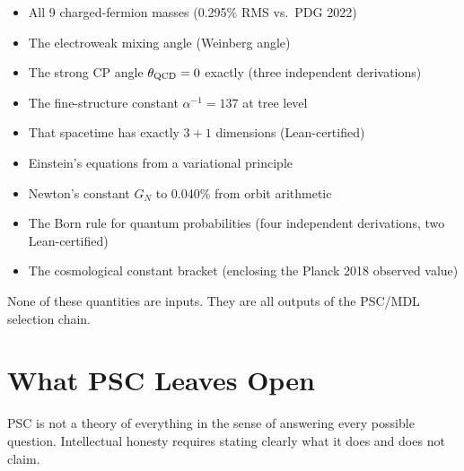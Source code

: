 \documentclass[11pt,a4paper]{article}
\begin{document}
\begin{itemize}[itemsep=3pt]
  \item All 9 charged-fermion masses (0.295\% RMS vs.\ PDG 2022)
  \item The electroweak mixing angle (Weinberg angle)
  \item The strong CP angle $\theta_{\rm QCD} = 0$ exactly (three independent derivations)
  \item The fine-structure constant $\alpha^{-1} = 137$ at tree level
  \item That spacetime has exactly $3{+}1$ dimensions (Lean-certified)
  \item Einstein's equations from a variational principle
  \item Newton's constant $G_N$ to 0.040\% from orbit arithmetic
  \item The Born rule for quantum probabilities (four independent derivations, two Lean-certified)
  \item The cosmological constant bracket (enclosing the Planck 2018 observed value)
\end{itemize}

None of these quantities are inputs.  They are all outputs of the PSC/MDL selection
chain.

\section{What PSC Leaves Open}
\label{sec:open}

PSC is not a theory of everything in the sense of answering every possible question.
Intellectual honesty requires stating clearly what it does and does not claim.
\end{document}
